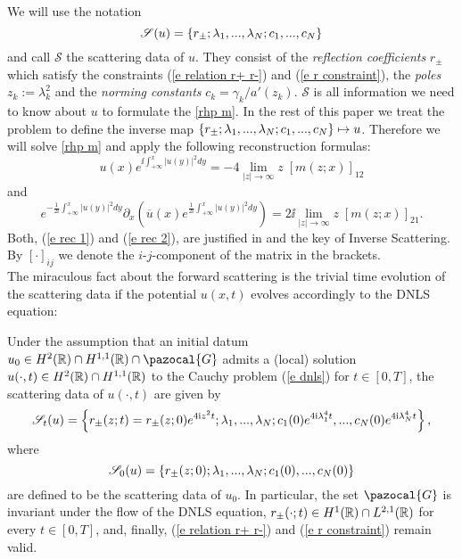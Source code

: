 We will use the notation
\begin{equation*}
    \mathcal{S}(u)=\left\{r_{\pm};\lambda_1,... ,\lambda_N;c_1,...,c_N\right\}
\end{equation*}
and call $\mathcal{S}$ the scattering data of $u$. They consist of the \emph{reflection coefficients} $r_{\pm}$ which satisfy the constraints (\ref{e relation r+ r-}) and (\ref{e r constraint}), the \emph{poles} $z_k:=\lambda_k^2$ and the \emph{norming constants} $c_k=\gamma_k/a'(z_k)$. $\mathcal{S}$ is all information we need to know about $u$ to formulate the \rh\ref{rhp m}. In the rest of this paper we treat the problem to define the inverse map $\left\{r_{\pm};\lambda_1,... ,\lambda_N;c_1,...,c_N\right\}\mapsto u$. Therefore we will solve \rh \ref{rhp m} and apply the following reconstruction formulas:
\begin{equation}\label{e rec 1}
    u(x)e^{\ii\int_{+\infty}^x|u(y)|^2dy}= -4\lim_{|z|\to\infty}z\;[m(z;x)]_{12}
\end{equation}
and
\begin{equation}\label{e rec 2}
    e^{-\frac{1}{2\ii}\int_{+\infty}^x|u(y)|^2dy} \partial_x\left(\overline{u}(x) e^{\frac{1}{2\ii}\int_{+\infty}^x|u(y)|^2dy}\right) =2\ii\lim_{|z|\to\infty}z\;[m(z;x)]_{21}.
\end{equation}
Both, (\ref{e rec 1}) and (\ref{e rec 2}), are justified in \cite{Pelinovsky2016} and the key of Inverse Scattering. By $[\cdot]_{ij}$ we denote the $i$-$j$-component of the matrix in the brackets.\\
The miraculous fact about the forward scattering is the trivial time evolution of the scattering data if the potential $u(x,t)$ evolves accordingly to the DNLS equation:
\begin{lem}\label{l time dependence scattering data}
    Under the assumption that an initial datum $u_0\in H^2(\Real)\cap H^{1,1}(\Real)\cap \pazocal{G}$ admits a (local) solution $u(\cdot,t)\in H^2(\mathbb R)\cap H^{1,1}(\mathbb R)$ to the Cauchy problem (\ref{e dnls}) for $t\in[0,T]$, the scattering data of $u(\cdot,t)$ are given by
    \begin{equation}\label{e time dependence scattering data}
        \mathcal{S}_t(u)=\left\{r_{\pm}(z;t)=r_{\pm}(z;0) e^{4\mathrm{i} z^2t};\lambda_1,... ,\lambda_N;c_1(0) e^{4\mathrm{i} \lambda_1^4t},...,c_N(0) e^{4\mathrm{i} \lambda_N^4t}\right\},
    \end{equation}
    where
    \begin{equation*}
        \mathcal{S}_0(u)=\left\{r_{\pm}(z;0);\lambda_1,... ,\lambda_N;c_1(0),...,c_N(0)\right\}
    \end{equation*}
    are defined to be the scattering data of $u_0$. In particular, the set $\pazocal{G}$ is invariant under the flow of the DNLS equation, $r_{\pm}(\cdot;t)\in H^1(\mathbb R)\cap L^{2,1}(\mathbb R)$ for every $t\in[0,T]$, and, finally, (\ref{e relation r+ r-}) and (\ref{e r constraint}) remain valid.
\end{lem}
